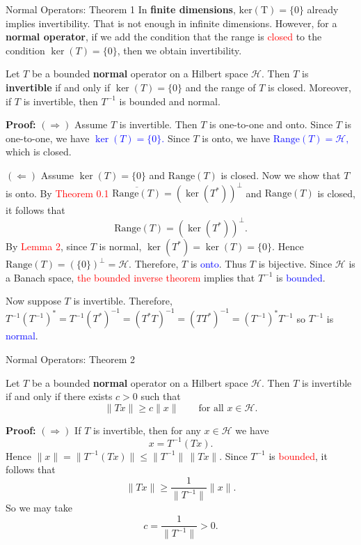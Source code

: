\documentclass[9pt, aspectratio=169]{beamer}
\begin{document}
\begin{frame}{Normal Operators: Theorem 1}
In \textbf{finite dimensions}, $\mathrm{ker(T)}=\{0\}$ already implies invertibility. That is not enough in infinite dimensions. However, for a\textbf{ normal operator}, if we add the condition that the range is \textcolor{red}{closed} to the condition $\ker(T)=\{0\}$, then we obtain invertibility.
\pause
\begin{tcolorbox}[colback=blue!5, colframe=blue!60!black, title=Theorem 1]
Let $T$ be a bounded \textbf{normal} operator on a Hilbert space $\mathcal{H}$. Then $T$ is \textbf{invertible} if and only if $\ker(T)=\{0\}$ and the range of $T$ is closed. Moreover, if $T$ is invertible, then $T^{-1}$ is bounded and normal.
\end{tcolorbox}
\pause

{\fontsize{8.5pt}{6pt}\selectfont 
\textbf{Proof:} $(\Rightarrow)$ Assume $T$ is invertible. Then $T$ is one-to-one and onto. Since $T$ is one-to-one, we have
\textcolor{blue}{$
\ker(T)=\{0\}.
$}
Since $T$ is onto, we have
\textcolor{blue}{$
\mathrm{Range}(T)=\mathcal{H},
$}
which is closed.

\pause
$(\Leftarrow)$ Assume $\ker(T)=\{0\}$ and $\mathrm{Range}(T)$ is closed. Now we show that $T$ is onto. By \textcolor{red}{Theorem 0.1}
$
\overline{\mathrm{Range}(T)}=(\ker(T^*))^\perp
$
and $\mathrm{Range}(T)$ is closed, it follows that
\[
\mathrm{Range}(T)=(\ker(T^*))^\perp.
\]
By \textcolor{red}{Lemma 2}, since $T$ is normal,
$
\ker(T^*)=\ker(T)=\{0\}.
$
Hence
$
\mathrm{Range}(T)=(\{0\})^\perp=\mathcal{H}.
$
Therefore, $T$ is \textcolor{blue}{onto}. Thus $T$ is bijective. Since $\mathcal{H}$ is a Banach space, \textcolor{red}{the bounded inverse theorem }implies that $T^{-1}$ is \textcolor{blue}{bounded}.

Now suppose $T$ is invertible. Therefore,$
T^{-1}(T^{-1})^*=T^{-1}(T^*)^{-1}=(T^*T)^{-1}
=(TT^*)^{-1}=(T^{-1})^{*}T^{-1}$ so $T^{-1}$ is \textcolor{blue}{normal}.}
\square

\end{frame}

\begin{frame}{Normal Operators: Theorem 2 }
\begin{tcolorbox}[colback=blue!5, colframe=blue!60!black, title=Theorem 2]
Let $T$ be a bounded \textbf{normal} operator on a Hilbert space $\mathcal{H}$. Then $T$ is invertible if and only if there exists $c>0$ such that
\[
\|Tx\|\ge c\|x\| \qquad \text{for all } x\in\mathcal{H}.
\]
\end{tcolorbox}
\pause
\textbf{Proof:} \textbf{$(\Rightarrow)$} If $T$ is invertible, then for any $x\in\mathcal{H}$ we have
$$
x=T^{-1}(Tx).
$$
Hence
$
\|x\|=\|T^{-1}(Tx)\|\le \|T^{-1}\|\,\|Tx\|.
$
Since $T^{-1}$ is \textcolor{red}{bounded}, it follows that
$$
\|Tx\|\ge \frac{1}{\|T^{-1}\|}\|x\|.
$$
So we may take
\[
c=\frac{1}{\|T^{-1}\|}>0.
\]



\end{frame}
\end{document}
